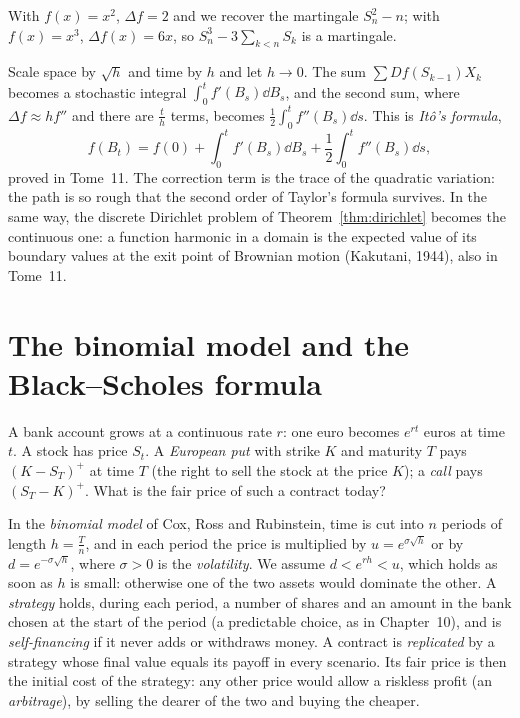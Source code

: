 With $f(x)=x^2$, $\Delta f=2$ and we recover the martingale $S_n^2-n$; with $f(x)=x^3$, $\Delta f(x)=6x$, so $S_n^3-3\sum_{k<n}S_k$ is a martingale.

\begin{remark}
Scale space by $\sqrt h$ and time by $h$ and let $h\to0$. The sum $\sum Df(S_{k-1})X_k$ becomes a stochastic integral $\int_0^tf'(B_s)\dd B_s$, and the second
sum, where $\Delta f\approx h f''$ and there are $\frac th$ terms, becomes $\frac12\int_0^tf''(B_s)\dd s$. This is \emph{It\^o's formula},
\[
f(B_t)=f(0)+\int_0^tf'(B_s)\dd B_s+\frac12\int_0^tf''(B_s)\dd s,
\]
proved in Tome~11. The correction term is the trace of the quadratic variation: the path is so rough that the second order
of Taylor's formula survives. In the same way, the discrete Dirichlet problem of Theorem~\ref{thm:dirichlet} becomes the continuous one: a
function harmonic in a domain is the expected value of its boundary values at the exit point of Brownian motion
(Kakutani, 1944), also in Tome~11.
\end{remark}

\section{The binomial model and the Black--Scholes formula}

A bank account grows at a continuous rate $r$: one euro becomes $e^{rt}$ euros at time $t$. A stock has price $S_t$. A \emph{European
put} with strike $K$ and maturity $T$ pays $(K-S_T)^+$ at time $T$ (the right to sell the stock at the price $K$); a \emph{call} pays $(S_T-K)^+$.
What is the fair price of such a contract today?

In the \emph{binomial model} of Cox, Ross and Rubinstein, time is cut into $n$ periods of length $h=\frac Tn$, and in each period the
price is multiplied by $u=e^{\sigma\sqrt h}$ or by $d=e^{-\sigma\sqrt h}$, where $\sigma>0$ is the \emph{volatility}. We assume $d<e^{rh}<u$, which holds as soon as $h$ is small: otherwise
one of the two assets would dominate the other. A \emph{strategy} holds, during each period, a number of shares and an amount
in the bank chosen at the start of the period (a predictable choice, as in Chapter~10), and is \emph{self-financing} if it never
adds or withdraws money. A contract is \emph{replicated} by a strategy whose final value equals its payoff in every
scenario. Its fair price is then the initial cost of the strategy: any other price would allow a riskless profit
(an \emph{arbitrage}), by selling the dearer of the two and buying the cheaper.

